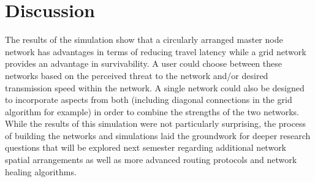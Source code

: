 \documentclass[10pt]{article}
\begin{document}
\section{Discussion}
The results of the simulation show that a circularly arranged master node network has advantages in terms of reducing travel latency while a grid network provides an advantage in survivability. A user could choose between these networks based on the perceived threat to the network and/or desired transmission speed within the network. A single network could also be designed to incorporate aspects from both  (including diagonal connections in the grid algorithm for example) in order to combine the strengths of the two networks. While the results of this simulation were not particularly surprising, the process of building the networks and simulations laid the groundwork for deeper research questions that will be explored next semester regarding additional network spatial arrangements as well as more advanced routing protocols and network healing algorithms.
\end{document}
